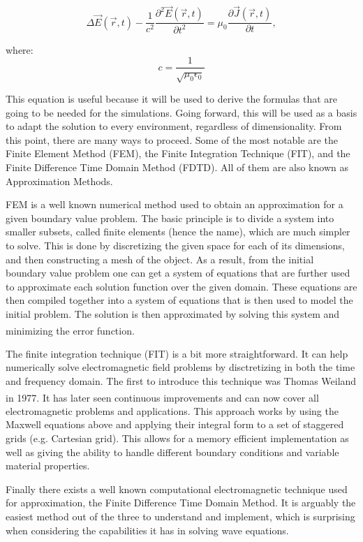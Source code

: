 \begin{equation}
	\label{eqn:waveEquation}
	\Delta\vec{E}(\vec{r},t) - \frac{1}{c^2} \frac{\partial^2 \vec{E}(\vec{r},t)}{\partial t^2} = \mu_{0} \frac{\partial \vec{J}(\vec{r},t)}{\partial t},
\end{equation}

where: $$c = \frac{1}{\sqrt{\mu_{0}\epsilon_{0}}}$$

This equation is useful because it will be used to derive the formulas that are going to be needed for the simulations. Going forward, this will be used as a basis to adapt the solution to every environment, regardless of dimensionality. From this point, there are many ways to proceed. Some of the most notable are the Finite Element Method (FEM), the Finite Integration Technique (FIT), and the Finite Difference Time Domain Method (FDTD). All of them are also known as Approximation Methods.

FEM is a well known numerical method used to obtain an approximation for a given boundary value problem. The basic principle is to divide a system into smaller subsets, called finite elements (hence the name), which are much simpler to solve. This is done by discretizing the given space for each of its dimensions, and then constructing a mesh of the object. As a result, from the initial boundary value problem one can get a system of equations that are further used to approximate each solution function over the given domain. These equations are then compiled together into a system of equations that is then used to model the initial problem. The solution is then approximated by solving this system and minimizing the error function.\textsuperscript{\cite{logan2011first}}

The finite integration technique (FIT) is a bit more straightforward. It can help numerically solve electromagnetic field problems by disctretizing in both the time and frequency domain. The first to introduce this technique was Thomas Weiland in 1977.\textsuperscript{\cite{weiland1977discretization}} It has later seen continuous improvements and can now cover all electromagnetic problems and applications. This approach works by using the Maxwell equations above and applying their integral form to a set of staggered grids (e.g. Cartesian grid). This allows for a memory efficient implementation as well as giving the ability to handle different boundary conditions and variable material properties.

Finally there exists a well known computational electromagnetic technique used for approximation, the Finite Difference Time Domain Method. It is arguably the easiest method out of the three to understand and implement, which is surprising when considering the capabilities it has in solving wave equations. 

